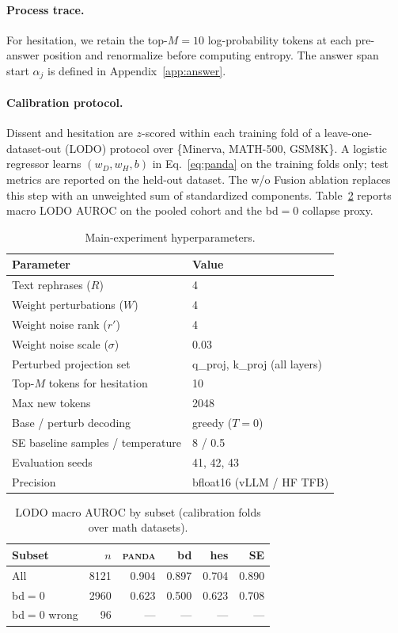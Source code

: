 \documentclass{article} %
\DeclareRobustCommand{\method}{%
  \texorpdfstring{%
    \ifmmode\text{\normalfont\textsc{panda}}\else\textsc{panda}\xspace\fi
  }{PANDA}%
}
\begin{document}
\paragraph{Process trace.}
For hesitation, we retain the top-$M{=}10$ log-probability tokens at each pre-answer position and renormalize before computing entropy.
The answer span start $\alpha_j$ is defined in Appendix~\ref{app:answer}.

\paragraph{Calibration protocol.}
Dissent and hesitation are $z$-scored within each training fold of a leave-one-dataset-out (LODO) protocol over \{Minerva, MATH-500, GSM8K\}.
A logistic regressor learns $(w_D,w_H,b)$ in Eq.~\ref{eq:panda} on the training folds only; test metrics are reported on the held-out dataset.
The w/o Fusion ablation replaces this step with an unweighted sum of standardized components.
Table~\ref{tab:lodo-calib} reports macro LODO AUROC on the pooled cohort and the bd$=0$ collapse proxy.

\begin{table}[t]
  \centering
  \small
  \caption{Main-experiment hyperparameters.}
  \label{tab:impl-hyper}
  \begin{tabular}{ll}
    \toprule
    Parameter & Value \\
    \midrule
    Text rephrases ($R$) & 4 \\
    Weight perturbations ($W$) & 4 \\
    Weight noise rank ($r'$) & 4 \\
    Weight noise scale ($\sigma$) & 0.03 \\
    Perturbed projection set & q\_proj, k\_proj (all layers) \\
    Top-$M$ tokens for hesitation & 10 \\
    Max new tokens & 2048 \\
    Base / perturb decoding & greedy ($T{=}0$) \\
    SE baseline samples / temperature & 8 / 0.5 \\
    Evaluation seeds & 41, 42, 43 \\
    Precision & bfloat16 (vLLM / HF TFB) \\
    \bottomrule
  \end{tabular}
\end{table}

\begin{table}[t]
  \centering
  \small
  \caption{LODO macro AUROC by subset (calibration folds over math datasets).}
  \label{tab:lodo-calib}
  \begin{tabular}{lrrrrr}
    \toprule
    Subset & $n$ & \method{} & bd & hes & SE \\
    \midrule
    All      & 8121 & 0.904 & 0.897 & 0.704 & 0.890 \\
    bd$=0$   & 2960 & 0.623 & 0.500 & 0.623 & 0.708 \\
    bd$=0$ wrong & 96 & --- & --- & --- & --- \\
    \bottomrule
  \end{tabular}
\end{table}
\end{document}
